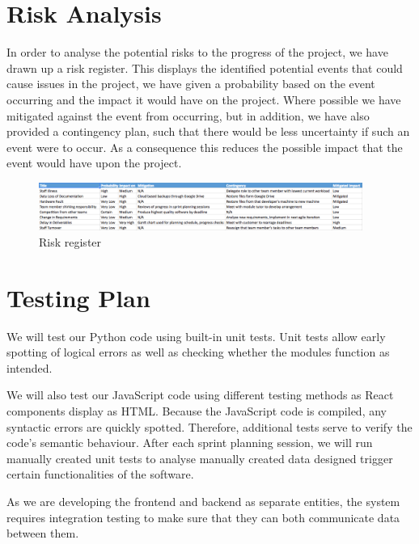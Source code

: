 \documentclass[11pt, oneside, a4paper]{article}
\begin{document}
\section{Risk Analysis}
In order to analyse the potential risks to the progress of the project, we have
drawn up a risk register. This displays the identified potential events that could
cause issues in the project, we have given a probability based on the event occurring
and the impact it would have on the project. Where possible we have mitigated against
the event from occurring, but in addition, we have also provided a contingency plan,
such that there would be less uncertainty if such an event were to occur. As a
consequence this reduces the possible impact that the event would have upon the
project.

\begin{figure}[h]
	\centering
		\includegraphics[width=400px]{RiskRegister.png}
	\caption{Risk register}
	\label{RiskRegister}
\end{figure}

\section{Testing Plan}
We will test our Python code using built-in unit tests. Unit tests allow early
spotting of logical errors as well as checking whether the modules function as
intended.

We will also test our JavaScript code using different testing methods as React
components display as HTML. Because the JavaScript code is compiled, any syntactic
errors are quickly spotted. Therefore, additional tests serve to verify the code’s
semantic behaviour. After each sprint planning session, we will run manually
created unit tests to analyse manually created data designed trigger certain
functionalities of the software.

As we are developing the frontend and backend as separate entities, the system
requires integration testing to make sure that they can both communicate data
between them.
\end{document}
